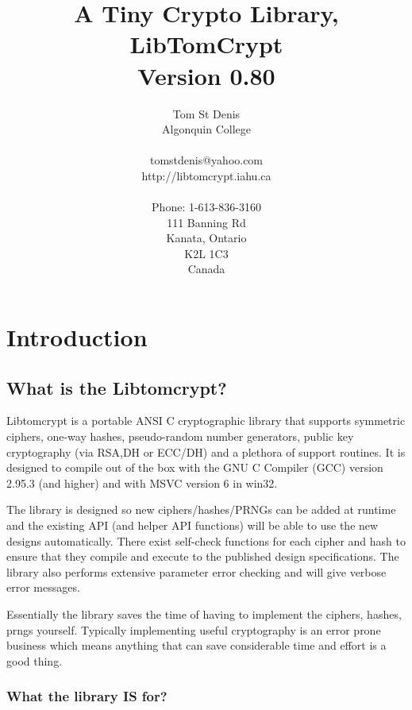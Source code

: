\documentclass{book}
\begin{document}
\title{A Tiny Crypto Library, \\ LibTomCrypt \\ Version 0.80}
\author{Tom St Denis \\
Algonquin College \\
\\
tomstdenis@yahoo.com \\
http://libtomcrypt.iahu.ca \\ \\
Phone: 1-613-836-3160\\
111 Banning Rd \\
Kanata, Ontario \\
K2L 1C3 \\
Canada 
}
\maketitle
\newpage
\tableofcontents
\chapter{Introduction}
\section{What is the Libtomcrypt?}
Libtomcrypt is a portable ANSI C cryptographic library that supports symmetric ciphers, one-way hashes, 
pseudo-random number generators, public key cryptography (via RSA,DH or ECC/DH) and a plethora of support 
routines.  It is designed to compile out of the box with the GNU C Compiler (GCC) version 2.95.3 (and higher) 
and with MSVC version 6 in win32.

The library is designed so new ciphers/hashes/PRNGs can be added at runtime and the existing API (and helper API functions) will 
be able to use the new designs automatically.  There exist self-check functions for each cipher and hash to ensure that
they compile and execute to the published design specifications.  The library also performs extensive parameter error checking
and will give verbose error messages.

Essentially the library saves the time of having to implement the ciphers, hashes, prngs yourself.  Typically implementing
useful cryptography is an error prone business which means anything that can save considerable time and effort is a good
thing.

\subsection{What the library IS for?}
\end{document}
